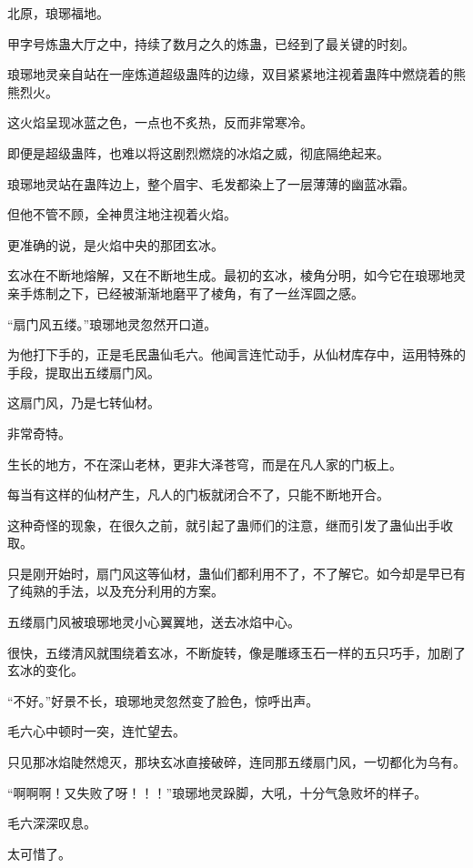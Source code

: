 
\begin{this_body}

北原，琅琊福地。

甲字号炼蛊大厅之中，持续了数月之久的炼蛊，已经到了最关键的时刻。

琅琊地灵亲自站在一座炼道超级蛊阵的边缘，双目紧紧地注视着蛊阵中燃烧着的熊熊烈火。

这火焰呈现冰蓝之色，一点也不炙热，反而非常寒冷。

即便是超级蛊阵，也难以将这剧烈燃烧的冰焰之威，彻底隔绝起来。

琅琊地灵站在蛊阵边上，整个眉宇、毛发都染上了一层薄薄的幽蓝冰霜。

但他不管不顾，全神贯注地注视着火焰。

更准确的说，是火焰中央的那团玄冰。

玄冰在不断地熔解，又在不断地生成。最初的玄冰，棱角分明，如今它在琅琊地灵亲手炼制之下，已经被渐渐地磨平了棱角，有了一丝浑圆之感。

“扇门风五缕。”琅琊地灵忽然开口道。

为他打下手的，正是毛民蛊仙毛六。他闻言连忙动手，从仙材库存中，运用特殊的手段，提取出五缕扇门风。

这扇门风，乃是七转仙材。

非常奇特。

生长的地方，不在深山老林，更非大泽苍穹，而是在凡人家的门板上。

每当有这样的仙材产生，凡人的门板就闭合不了，只能不断地开合。

这种奇怪的现象，在很久之前，就引起了蛊师们的注意，继而引发了蛊仙出手收取。

只是刚开始时，扇门风这等仙材，蛊仙们都利用不了，不了解它。如今却是早已有了纯熟的手法，以及充分利用的方案。

五缕扇门风被琅琊地灵小心翼翼地，送去冰焰中心。

很快，五缕清风就围绕着玄冰，不断旋转，像是雕琢玉石一样的五只巧手，加剧了玄冰的变化。

“不好。”好景不长，琅琊地灵忽然变了脸色，惊呼出声。

毛六心中顿时一突，连忙望去。

只见那冰焰陡然熄灭，那块玄冰直接破碎，连同那五缕扇门风，一切都化为乌有。

“啊啊啊！又失败了呀！！！”琅琊地灵跺脚，大吼，十分气急败坏的样子。

毛六深深叹息。

太可惜了。


\end{this_body}
